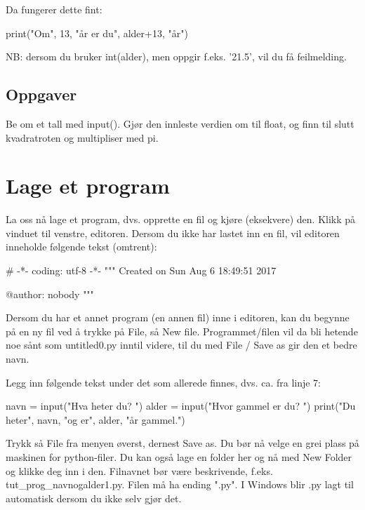 {Da fungerer dette fint: 

\begin{usncodebox}
print("Om", 13, "år er du", alder+13, "år") 
\end{usncodebox}

NB: dersom du bruker int(alder), men oppgir f.eks. '21.5', vil du få feilmelding. 

\subsection{Oppgaver}

\begin{question}
Be om et tall med input(). Gjør den innleste verdien om til float, og finn til slutt kvadratroten og multipliser med pi. 
\end{question}

\section{Lage et program}

La oss nå lage et program, dvs. opprette en fil og kjøre (eksekvere) den.  Klikk på vinduet til venstre, editoren.  Dersom du ikke har lastet inn en fil, vil editoren inneholde følgende tekst (omtrent): 

\begin{usncodebox}
# -*- coding: utf-8 -*-
"""
Created on Sun Aug  6 18:49:51 2017

@author: nobody
"""
\end{usncodebox}

Dersom du har et annet program (en annen fil) inne i editoren, kan du begynne på en ny fil ved å trykke på File, så New file. Programmet/filen vil da bli hetende noe sånt som untitled0.py inntil videre, til du med File / Save as gir den et bedre navn. 

Legg inn følgende tekst under det som allerede finnes, dvs. ca. fra linje 7: 

\begin{usncodebox}
navn = input("Hva heter du? ")
alder = input("Hvor gammel er du? ") 
print("Du heter", navn, "og er", alder, "år gammel.") 
\end{usncodebox}

Trykk så File fra menyen øverst, dernest Save as. Du bør nå velge en grei plass på maskinen for python-filer. Du kan også lage en folder her og nå med New Folder og klikke deg inn i den. Filnavnet bør være beskrivende, f.eks. tut\_{}prog\_{}navnogalder1.py. Filen må ha ending ".py". I Windows blir .py lagt til automatisk dersom du ikke selv gjør det. 

}
